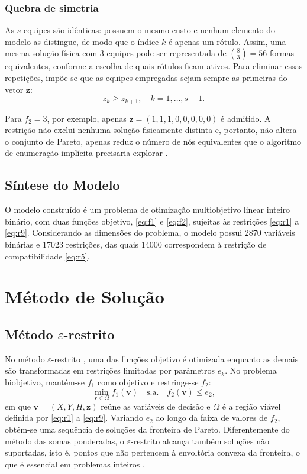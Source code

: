 \documentclass[conference]{IEEEtran}
\begin{document}
\subsubsection{Quebra de simetria}
As $s$ equipes são idênticas: possuem o mesmo custo e nenhum elemento do modelo as distingue, de modo que o índice $k$ é apenas um rótulo. Assim, uma mesma solução física com 3 equipes pode ser representada de $\binom{8}{3} = 56$ formas equivalentes, conforme a escolha de quais rótulos ficam ativos. Para eliminar essas repetições, impõe-se que as equipes empregadas sejam sempre as primeiras do vetor $\mathbf{z}$:
\begin{equation}
z_k \ge z_{k+1}, \quad k = 1,\dots,s-1.
\label{eq:r9}
\end{equation}

Para $f_2 = 3$, por exemplo, apenas $\mathbf{z} = (1,1,1,0,0,0,0,0)$ é admitido. A restrição não exclui nenhuma solução fisicamente distinta e, portanto, não altera o conjunto de Pareto, apenas reduz o número de nós equivalentes que o algoritmo de enumeração implícita precisaria explorar \cite{margot2010}.

\subsection{Síntese do Modelo}

O modelo construído é um problema de otimização multiobjetivo linear inteiro binário, com duas funções objetivo, \eqref{eq:f1} e \eqref{eq:f2}, sujeitas às restrições \eqref{eq:r1} a \eqref{eq:r9}. Considerando as dimensões do problema, o modelo possui 2870 variáveis binárias e 17023 restrições, das quais 14000 correspondem à restrição de compatibilidade \eqref{eq:r5}.

\section{Método de Solução}

\subsection{Método $\varepsilon$-restrito}

No método $\varepsilon$-restrito \cite{haimes1971,chankong1983}, uma das funções objetivo é otimizada enquanto as demais são transformadas em restrições limitadas por parâmetros $e_k$. No problema biobjetivo, mantém-se $f_1$ como objetivo e restringe-se $f_2$:
\begin{equation}
\min_{\mathbf{v}\in\Omega} f_1(\mathbf{v}) \quad \text{s.a.} \quad f_2(\mathbf{v}) \le e_2,
\label{eq:eps}
\end{equation}
em que $\mathbf{v} = (X, Y, H, \mathbf{z})$ reúne as variáveis de decisão e $\Omega$ é a região viável definida por \eqref{eq:r1} a \eqref{eq:r9}. Variando $e_2$ ao longo da faixa de valores de $f_2$, obtém-se uma sequência de soluções da fronteira de Pareto. Diferentemente do método das somas ponderadas, o $\varepsilon$-restrito alcança também soluções não suportadas, isto é, pontos que não pertencem à envoltória convexa da fronteira, o que é essencial em problemas inteiros \cite{mavrotas2009}.
\end{document}
